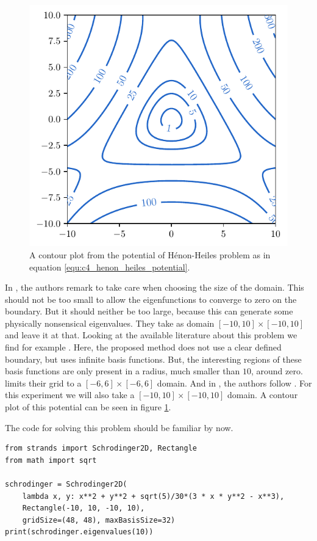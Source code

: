 \begin{figure}
    \begin{center}
      \includegraphics[width=.5\textwidth]{img/chapter4/henon_contour.pdf}
    \end{center}
    \caption{A contour plot from the potential of Hénon-Heiles problem as in equation \eqref{equ:c4_henon_heiles_potential}.}
    \label{fig:c4_henon_contour}
  \end{figure}

In \cite{wang_new_2009}, the authors remark to take care when choosing the size of the domain. This should not be too small to allow the eigenfunctions to converge to zero on the boundary. But it should neither be too large, because this can generate some physically nonsensical eigenvalues. They take as domain $[-10, 10] \times [-10, 10]$ and leave it at that. Looking at the available literature about this problem we find for example \cite{davis_semiclassical_1979}. Here, the proposed method does not use a clear defined boundary, but uses infinite basis functions. But, the interesting regions of these basis functions are only present in a radius, much smaller than $10$, around zero. \cite{braun_efficient_1996} limits their grid to a $[-6, 6] \times [-6, 6]$ domain. And in \cite{baeyens_improvements_2022}, the authors follow \cite{braun_efficient_1996}. For this experiment we will also take a $[-10, 10] \times [-10, 10]$ domain. A contour plot of this potential can be seen in figure \ref{fig:c4_henon_contour}.

The code for solving this problem should be familiar by now.
\begin{verbatim}
from strands import Schrodinger2D, Rectangle
from math import sqrt

schrodinger = Schrodinger2D(
    lambda x, y: x**2 + y**2 + sqrt(5)/30*(3 * x * y**2 - x**3),
    Rectangle(-10, 10, -10, 10),
    gridSize=(48, 48), maxBasisSize=32)
print(schrodinger.eigenvalues(10))
\end{verbatim}

